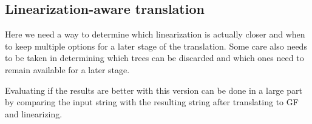 
\subsection{Linearization-aware translation}
Here we need a way to determine which linearization is actually closer and when to keep multiple options for a later stage of the translation. Some care also needs to be taken in determining which trees can be discarded and which ones need to remain available for a later stage.

Evaluating if the results are better with this version can be done in a large part by comparing the input string with the resulting string after translating to GF and linearizing.
